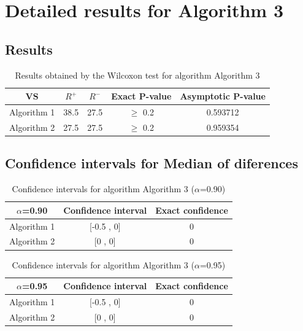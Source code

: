 \documentclass[a4paper,10pt]{article}
\begin{document}
 \clearpage 


\section{Detailed results for Algorithm 3}


\subsection{Results}

\begin{table}[!htp]
\centering\small
\begin{tabular}{
|c|c|c|c|c|}
\hline
 VS & $R^{+}$ & $R^{-}$ & Exact P-value & Asymptotic P-value \\ \hline 
Algorithm 1 & 38.5 & 27.5 & $\geq$ 0.2 & 0.593712\\ \hline 
Algorithm 2 & 27.5 & 27.5 & $\geq$ 0.2 & 0.959354\\ \hline 

\end{tabular}
\caption{Results obtained by the Wilcoxon test for algorithm Algorithm 3}
\end{table}

\subsection{Confidence intervals for Median of diferences}

\begin{table}[!htp]
\centering\small
\begin{tabular}{
|c|c|c|}
\hline
 $\alpha$=0.90 & Confidence interval & Exact confidence \\ \hline 
Algorithm 1 & [-0.5 , 0] & 0\\ \hline 
Algorithm 2 & [0 , 0] & 0\\ \hline 

\end{tabular}
\caption{Confidence intervals for algorithm Algorithm 3 ($\alpha$=0.90)}
\end{table}
\begin{table}[!htp]
\centering\small
\begin{tabular}{
|c|c|c|}
\hline
 $\alpha$=0.95 & Confidence interval & Exact confidence \\ \hline 
Algorithm 1 & [-0.5 , 0] & 0\\ \hline 
Algorithm 2 & [0 , 0] & 0\\ \hline 

\end{tabular}
\caption{Confidence intervals for algorithm Algorithm 3 ($\alpha$=0.95)}
\end{table}

 \clearpage 
\end{document}
